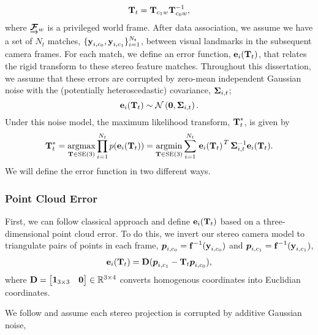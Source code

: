 \begin{equation}
	\boldsymbol{\mathbf{T}}_t = \boldsymbol{\mathbf{T}}_{c_1w} \boldsymbol{\mathbf{T}}^{-1}_{c_0w},
\end{equation}
where $\underrightarrow{ \boldsymbol{\mathbf{\mathcal{F}}} }_{w}$ is a privileged world frame. After data association, we assume we have a set
of $N_t$ matches, $\{\boldsymbol{\mathbf{y}}_{i, c_0}, \boldsymbol{\mathbf{y}}_{i, c_1}\}_{i=1}^{N_t}$, between visual landmarks in the subsequent camera frames. For each match, we define an error function, $\boldsymbol{\mathbf{e}}_{i}(\boldsymbol{\mathbf{T}}_t)$, that relates the rigid transform to these stereo feature matches. Throughout this dissertation, we assume that these errors are corrupted by zero-mean independent Gaussian noise with the (potentially heteroscedastic) covariance, $\boldsymbol{\mathbf{\Sigma}}_{i,t}$;
 \begin{equation}
  \boldsymbol{\mathbf{e}}_{i}(\boldsymbol{\mathbf{T}}_t) \sim
 \mathcal{N}\left(\boldsymbol{\mathbf{0}}, \boldsymbol{\mathbf{\Sigma}}_{i,t}\right). 
\end{equation}
Under this noise model, the maximum likelihood transform, $\boldsymbol{\mathbf{T}}^*_t$, is given by 
\begin{equation}
\label{eq:vo_objective}
  \boldsymbol{\mathbf{T}}_t^* = \operatorname*{argmax}_{\boldsymbol{\mathbf{T}}\in\text{SE}(3)}\prod_{i=1}^{N_t} p(\boldsymbol{\mathbf{e}}_{i}(\boldsymbol{\mathbf{T}}_t)) = \operatorname*{argmin}_{\boldsymbol{\mathbf{T}}\in\text{SE}(3)}\sum_{i=1}^{N_t} 
  \left.{\boldsymbol{\mathbf{e}}_{i}(\boldsymbol{\mathbf{T}}_t)}\right.^T \boldsymbol{\mathbf{\Sigma}}_{i,t}^{-1} \boldsymbol{\mathbf{e}}_{i}(\boldsymbol{\mathbf{T}}_t).
\end{equation}
We will define the error function in two different ways.

\subsubsection{Point Cloud Error}
\label{sec:vo_point_cloud}
First, we can follow classical approach \citep{Maimone2007-tc} and define $ \boldsymbol{\mathbf{e}}_{i}(\boldsymbol{\mathbf{T}}_t) $ based on a three-dimensional point cloud error. To do this, we invert our stereo camera model to triangulate pairs of points in each frame, $\boldsymbol{p}_{i,c_0} = \boldsymbol{\mathbf{f}}^{-1}(\boldsymbol{\mathbf{y}}_{i, c_0})$ and $\boldsymbol{p}_{i,c_1} = \boldsymbol{\mathbf{f}}^{-1}(\boldsymbol{\mathbf{y}}_{i, c_1})$,
\begin{align}
	 \boldsymbol{\mathbf{e}}_{i}(\boldsymbol{\mathbf{T}}_t) = \boldsymbol{\mathbf{D}}(\boldsymbol{p}_{i,c_1} - \boldsymbol{\mathbf{T}}_t \boldsymbol{p}_{i,c_0}),
\end{align}
where $\boldsymbol{\mathbf{D}} = \begin{bmatrix} \boldsymbol{\mathbf{1}}_{3\times3} & \boldsymbol{\mathbf{0}} \end{bmatrix} \in \mathbb{R}{}^{3\times4}$ converts homogenous coordinates into Euclidian coordinates.

We follow \cite{Maimone2007-tc} and assume each stereo projection is corrupted by additive Gaussian noise,


